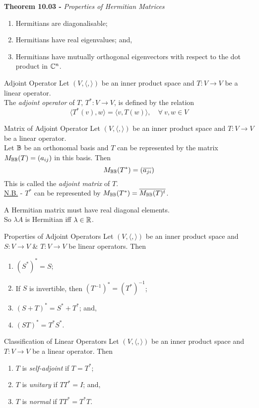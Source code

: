 \documentclass[11pt,a4paper]{article}
\begin{document}
\textbf{Theorem 10.03 - }\textit{Properties of Hermitian Matrices}
\begin{enumerate}[label=\roman*)]
  \item Hermitians are diagonalisable;
  \item Hermitians have real eigenvalues; and,
  \item Hermitians have mutually orthogonal eigenvectors with respect to the dot product in $\mathbb{C}^n$.
\end{enumerate}

\subtitle{Definition 10.04 - }{Adjoint Operator}
Let $(V, \langle,\rangle)$ be an inner product space and $T : V \to V$ be a linear operator.\\
The \textit{adjoint operator} of $T$, $T^* : V \to V$, is defined by the relation
$$\langle T^*(v), w \rangle = \langle v, T(w) \rangle,\quad \forall\ v, w \in V$$

\subtitle{Theorem 10.05 - }{Matrix of Adjoint Operator}
Let $(V, \langle,\rangle)$ be an inner product space and $T : V \to V$ be a linear operator.\\
Let $\mathbb{B}$ be an orthonomal basis and $T$ can be represented by the matrix $M_{\mathbb{B}\mathbb{B}}(T) = (a_{ij})$ in this basis. Then
$$M_{\mathbb{B}\mathbb{B}}(T^*) = (\overline{a_{ji}})$$
This is called the \textit{adjoint matrix} of $T$.\\
\underline{N.B.} - $T^*$ can be represented by $M_{\mathbb{B}\mathbb{B}}(T^*) = \overline{M_{\mathbb{B}\mathbb{B}}(T)^t}$.\\

\subtitle{Proposition 10.06}{}
A Hermitian matrix must have real diagonal elements.\\
So $\lambda A$ is Hermitian iff $\lambda \in \mathbb{R}$.\\

\subtitle{Theorem 10.07 - }{Properties of Adjoint Operators}
Let $(V, \langle,\rangle)$ be an inner product space and $S : V \to V$ \& $T : V \to V$ be linear operators. Then
\begin{enumerate}[label=\roman*)]
  \item $(S^*)^* = S$;
  \item If $S$ is invertible, then $(T^{-1})^* = (T^*)^{-1}$;
  \item $(S + T)^* = S^* + T^*$; and,
  \item $(ST)^* = T^*S^*$.
\end{enumerate}

\subtitle{Definition 10.08 - }{Classification of Linear Operators}
Let $(V, \langle,\rangle)$ be an inner product space and $T : V \to V$ be a linear operator. Then
\begin{enumerate}[label=\roman*)]
  \item $T$ is \textit{self-adjoint} if $T = T^*$;
  \item $T$ is \textit{unitary} if $TT^* = I$; and,
  \item $T$ is \textit{normal} if $TT^* = T^*T$.
\end{enumerate}
\end{document}
